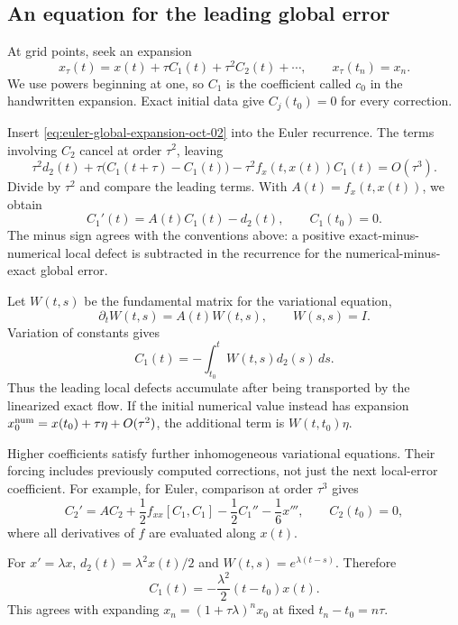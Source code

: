 \subsection{An equation for the leading global error}

At grid points, seek an expansion
\begin{equation}\label{eq:euler-global-expansion-oct-02}
 x_\tau(t)=x(t)+\tau C_1(t)+\tau^2C_2(t)+\cdots,
 \qquad x_\tau(t_n)=x_n.
\end{equation}
We use powers beginning at one, so \(C_1\) is the coefficient called
\(c_0\) in the handwritten expansion. Exact initial data give
\(C_j(t_0)=0\) for every correction.

Insert \eqref{eq:euler-global-expansion-oct-02} into the Euler
recurrence. The terms involving \(C_2\) cancel at order \(\tau^2\),
leaving
\[
 \tau^2d_2(t)+\tau\bigl(C_1(t+\tau)-C_1(t)\bigr)
      -\tau^2f_x(t,x(t))C_1(t)=O(\tau^3).
\]
Divide by \(\tau^2\) and compare the leading terms. With
\(A(t)=f_x(t,x(t))\), we obtain
\begin{equation}\label{eq:leading-global-error-oct-02}
 \boxed{C_1'(t)=A(t)C_1(t)-d_2(t),\qquad C_1(t_0)=0.}
\end{equation}
The minus sign agrees with the conventions above: a positive
exact-minus-numerical local defect is subtracted in the recurrence
for the numerical-minus-exact global error.

Let \(W(t,s)\) be the fundamental matrix for the variational
equation,
\[
 \partial_tW(t,s)=A(t)W(t,s),\qquad W(s,s)=I.
\]
Variation of constants gives
\begin{equation}\label{eq:error-integral-oct-02}
 C_1(t)=-\int_{t_0}^t W(t,s)d_2(s)\,ds.
\end{equation}
Thus the leading local defects accumulate after being transported
by the linearized exact flow. If the initial numerical value instead
has expansion \(x_0^{\rm num}=x(t_0)+\tau\eta+O(\tau^2)\), the
additional term is \(W(t,t_0)\eta\).

Higher coefficients satisfy further inhomogeneous variational
equations. Their forcing includes previously computed corrections,
not just the next local-error coefficient. For example, for Euler,
comparison at order \(\tau^3\) gives
\[
 C_2'=A C_2+\frac12f_{xx}[C_1,C_1]
                   -\frac12C_1''-\frac16x''',
 \qquad C_2(t_0)=0,
\]
where all derivatives of \(f\) are evaluated along \(x(t)\).

\begin{example}
 For \(x'=\lambda x\),
 \(d_2(t)=\lambda^2x(t)/2\) and \(W(t,s)=e^{\lambda(t-s)}\).
 Therefore
 \[
  C_1(t)=-\frac{\lambda^2}{2}(t-t_0)x(t).
 \]
 This agrees with expanding
 \(x_n=(1+\tau\lambda)^n x_0\) at fixed
 \(t_n-t_0=n\tau\).
\end{example}

